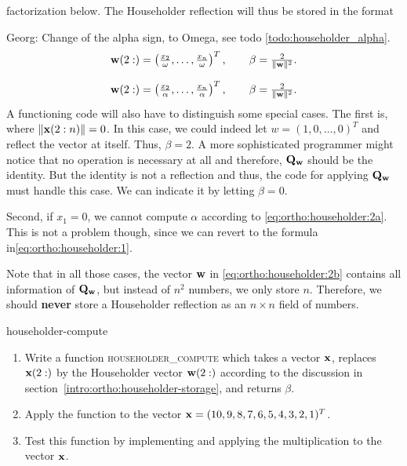 \begin{intro}
  factorization below. The Householder reflection will thus be stored in the format
  \begin{todo}
    Georg: Change of the alpha sign, to Omega, see todo \ref{todo:householder_alpha}.
  \begin{gather}
    \label{eq:ortho:householder:2b}
    \mathbf w(2:) = \left(\tfrac{x_2}{\omega},\dots,\tfrac{x_n}{\omega}\right)^T, \qquad \beta = \tfrac2{\lVert\mathbf w\rVert^2}.
  \end{gather}
\end{todo}
  \begin{gather}
    \label{eq:ortho:householder:2b}
    \mathbf w(2:) = \left(\tfrac{x_2}{\alpha},\dots,\tfrac{x_n}{\alpha}\right)^T, \qquad \beta = \tfrac2{\lVert\mathbf w\rVert^2}.
  \end{gather}
  A functioning code will also have to distinguish some special
  cases. The first is, where $\lVert\mathbf x(2:n)\rVert=0$. In this case, we
  could indeed let $w = (1,0,\dots,0)^T$ and reflect the vector at
  itself. Thus, $\beta = 2$. A more sophisticated programmer might
  notice that no operation is necessary at all and therefore,
  $\mathbf Q_{\mathbf w}$ should be the identity. But the identity is not a
  reflection and thus, the code for applying $\mathbf Q_{\mathbf w}$ must handle
  this case. We can indicate it by letting $\beta=0$.

  Second, if $x_1=0$, we cannot compute $\alpha$ according to
  \eqref{eq:ortho:householder:2a}. This is not a problem though, since
  we can revert to the formula in\eqref{eq:ortho:householder:1}.

  Note that in all those cases, the vector $\mathbf w$ in
  \eqref{eq:ortho:householder:2b} contains all information of
  $\mathbf Q_{\mathbf w}$, but instead of $n^2$ numbers, we only store
  $n$. Therefore, we should \textbf{never} store a Householder
  reflection as an $n\times n$ field of numbers.
\end{intro}

\begin{Problem}{householder-compute}
  \begin{enumerate}
  \item Write a function \textsc{householder\_compute} which takes a
    vector $\mathbf x$, replaces $\mathbf x(2:)$ by the Householder vector
    $\mathbf w(2:)$ according to the discussion in
    section~\ref{intro:ortho:householder-storage}, and returns
    $\beta$.

  \item Apply the function to the vector $\mathbf x=(10,9,8,7,6,5,4,3,2,1)^T$.
  \item Test this function by implementing
     and applying the
    multiplication to the vector $\mathbf x$.
  \end{enumerate}
\end{Problem}

